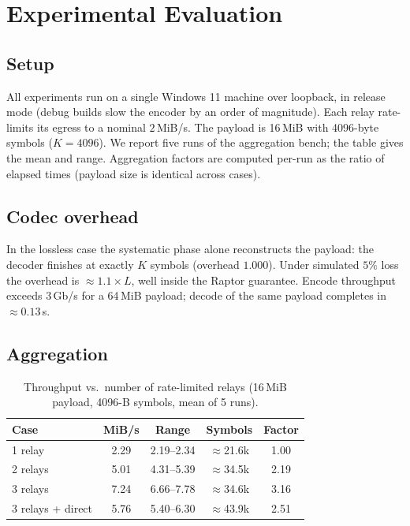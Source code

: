 \documentclass[conference]{IEEEtran}
\begin{document}
\section{Experimental Evaluation}
\label{sec:eval}

\subsection{Setup}
All experiments run on a single Windows 11 machine over loopback, in release
mode (debug builds slow the encoder by an order of magnitude). Each relay
rate-limits its egress to a nominal $2$\,MiB/s. The payload is 16\,MiB with
4096-byte symbols ($K=4096$). We report five runs of the aggregation bench;
the table gives the mean and range. Aggregation factors are computed per-run
as the ratio of elapsed times (payload size is identical across cases).

\subsection{Codec overhead}
In the lossless case the systematic phase alone reconstructs the payload:
the decoder finishes at exactly $K$ symbols (overhead $1.000$). Under simulated
$5\%$ loss the overhead is $\approx 1.1\times L$, well inside the Raptor
guarantee. Encode throughput exceeds $3$\,Gb/s for a 64\,MiB payload; decode of
the same payload completes in $\approx 0.13$\,s.

\subsection{Aggregation}
\begin{table}[!t]
\centering
\caption{Throughput vs.\ number of rate-limited relays (16\,MiB payload,
4096-B symbols, mean of 5 runs).}
\label{tab:bench}
\begin{tabular}{@{}lcccc@{}}
\toprule
Case & MiB/s & Range & Symbols & Factor \\
\midrule
1 relay & 2.29 & 2.19--2.34 & $\approx$21.6k & 1.00 \\
2 relays & 5.01 & 4.31--5.39 & $\approx$34.5k & 2.19 \\
3 relays & 7.24 & 6.66--7.78 & $\approx$34.6k & 3.16 \\
3 relays + direct & 5.76 & 5.40--6.30 & $\approx$43.9k & 2.51 \\
\bottomrule
\end{tabular}
\end{table}
\end{document}
